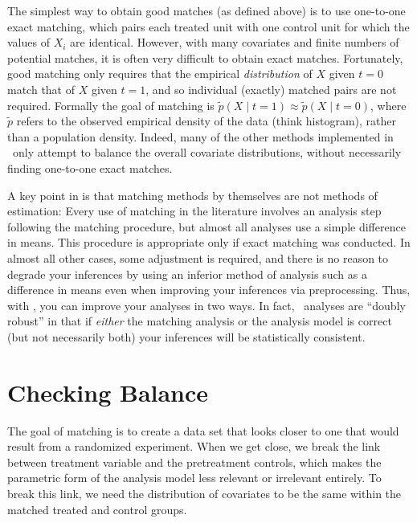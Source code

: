 The simplest way to obtain good matches (as defined above) is to use
one-to-one exact matching, which pairs each treated unit with one
control unit for which the values of $X_i$ are identical.  However,
with many covariates and finite numbers of potential matches, it is
often very difficult to obtain exact matches.  Fortunately, good
matching only requires that the empirical \emph{distribution} of $X$
given $t=0$ match that of $X$ given $t=1$, and so individual (exactly)
matched pairs are not required.  Formally the goal of matching is
$\tilde p(X\mid t=1) \approx \tilde p(X\mid t=0)$, where $\tilde p$
refers to the observed empirical density of the data (think
histogram), rather than a population density.  Indeed, many of the
other methods implemented in \MatchIt\ only attempt to balance the
overall covariate distributions, without necessarily finding
one-to-one exact matches.

A key point in \citet*{HoImaKin06} is that matching methods by
themselves are not methods of estimation: Every use of matching in the
literature involves an analysis step following the matching procedure,
but almost all analyses use a simple difference in means.  This
procedure is appropriate only if exact matching was conducted.  In
almost all other cases, some adjustment is required, and there is no
reason to degrade your inferences by using an inferior method of
analysis such as a difference in means even when improving your
inferences via preprocessing.  Thus, with \MatchIt, you can improve
your analyses in two ways.  In fact, \MatchIt\ analyses are ``doubly
robust'' in that if \emph{either} the matching analysis or the
analysis model is correct (but not necessarily both) your inferences
will be statistically consistent.

\section{Checking Balance}
\label{sec:balance-sum}

The goal of matching is to create a data set that looks closer to one
that would result from a randomized experiment.  When we get close, we
break the link between treatment variable and the pretreatment
controls, which makes the parametric form of the analysis model less
relevant or irrelevant entirely.  To break this link, we need the
distribution of covariates to be the same within the matched treated
and control groups.

